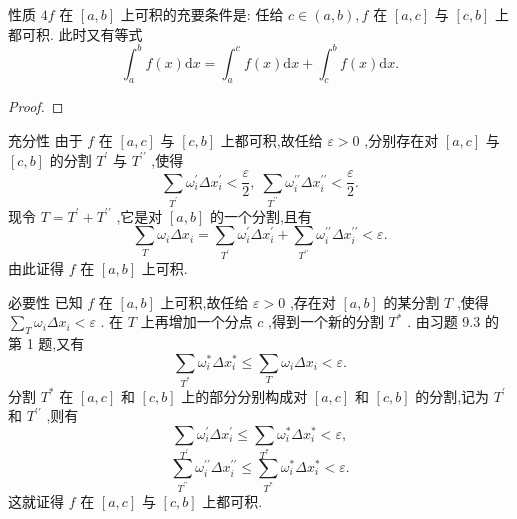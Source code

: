 性质 \({4f}\) 在 \(\left\lbrack  {a,b}\right\rbrack\) 上可积的充要条件是: 任给 \(c \in  \left( {a,b}\right) ,f\) 在 \(\left\lbrack  {a,c}\right\rbrack\) 与 \(\left\lbrack  {c,b}\right\rbrack\) 上都可积. 此时又有等式
\[
{\int }_{a}^{b}f\left( x\right) \mathrm{d}x = {\int }_{a}^{c}f\left( x\right) \mathrm{d}x + {\int }_{c}^{b}f\left( x\right) \mathrm{d}x. \tag{3}
\]
\begin{proof}

\end{proof}
充分性 由于 \(f\) 在 \(\left\lbrack  {a,c}\right\rbrack\) 与 \(\left\lbrack  {c,b}\right\rbrack\) 上都可积,故任给 \(\varepsilon  > 0\) ,分别存在对 \(\left\lbrack  {a,c}\right\rbrack\) 与 \(\left\lbrack  {c,b}\right\rbrack\) 的分割 \({T}^{\prime }\) 与 \({T}^{\prime \prime }\) ,使得
\[
\mathop{\sum }\limits_{{T}^{\prime }}{\omega }_{i}^{\prime }\Delta {x}_{i}^{\prime } < \frac{\varepsilon }{2},\;\mathop{\sum }\limits_{{T}^{\prime \prime }}{\omega }_{i}^{\prime \prime }\Delta {x}_{i}^{\prime \prime } < \frac{\varepsilon }{2}.
\]
现令 \(T = {T}^{\prime } + {T}^{\prime \prime }\) ,它是对 \(\left\lbrack  {a,b}\right\rbrack\) 的一个分割,且有
\[
\mathop{\sum }\limits_{T}{\omega }_{i}\Delta {x}_{i} = \mathop{\sum }\limits_{{T}^{\prime }}{\omega }_{i}^{\prime }\Delta {x}_{i}^{\prime } + \mathop{\sum }\limits_{{T}^{\prime \prime }}{\omega }_{i}^{\prime \prime }\Delta {x}_{i}^{\prime \prime } < \varepsilon .
\]
由此证得 \(f\) 在 \(\left\lbrack  {a,b}\right\rbrack\) 上可积.

必要性 已知 \(f\) 在 \(\left\lbrack  {a,b}\right\rbrack\) 上可积,故任给 \(\varepsilon  > 0\) ,存在对 \(\left\lbrack  {a,b}\right\rbrack\) 的某分割 \(T\) ,使得 \(\mathop{\sum }\limits_{T}{\omega }_{i}\Delta {x}_{i} < \varepsilon\) . 在 \(T\) 上再增加一个分点 \(c\) ,得到一个新的分割 \({T}^{ * }\) . 由习题 9.3 的第 1 题,又有
\[
\mathop{\sum }\limits_{{T}^{ * }}{\omega }_{i}^{ * }\Delta {x}_{i}^{ * } \leq  \mathop{\sum }\limits_{T}{\omega }_{i}\Delta {x}_{i} < \varepsilon .
\]
分割 \({T}^{ * }\) 在 \(\left\lbrack  {a,c}\right\rbrack\) 和 \(\left\lbrack  {c,b}\right\rbrack\) 上的部分分别构成对 \(\left\lbrack  {a,c}\right\rbrack\) 和 \(\left\lbrack  {c,b}\right\rbrack\) 的分割,记为 \({T}^{\prime }\) 和 \({T}^{\prime \prime }\) ,则有
\[
\mathop{\sum }\limits_{{T}^{\prime }}{\omega }_{i}^{\prime }\Delta {x}_{i}^{\prime } \leq  \mathop{\sum }\limits_{{T}^{ * }}{\omega }_{i}^{ * }\Delta {x}_{i}^{ * } < \varepsilon ,
\]
\[
\mathop{\sum }\limits_{{T}^{\prime \prime }}{\omega }_{i}^{\prime \prime }\Delta {x}_{i}^{\prime \prime } \leq  \mathop{\sum }\limits_{{T}^{ * }}{\omega }_{i}^{ * }\Delta {x}_{i}^{ * } < \varepsilon .
\]
这就证得 \(f\) 在 \(\left\lbrack  {a,c}\right\rbrack\) 与 \(\left\lbrack  {c,b}\right\rbrack\) 上都可积.

